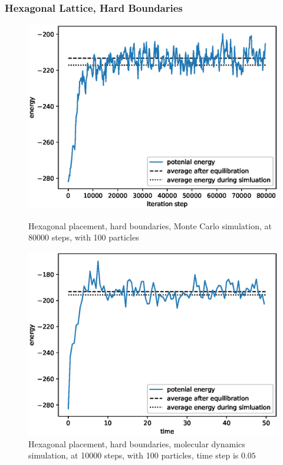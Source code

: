 \documentclass[UTF8,a4paper]{article}
\begin{document}
\subsubsection{Hexagonal Lattice, Hard Boundaries}
\begin{figure}[H]
	\centering
	\begin{minipage}[t]{0.45\textwidth}
		\centering
		\includegraphics[height=0.2\textheight]{fig/plot_hb_norand_80000_steps_100_particles_0.8442_rho_0.728_tempure_1.eps}
		\caption{Hexagonal placement, hard boundaries, Monte Carlo simulation, at 80000 steps, with 100 particles}
	\end{minipage}\hspace{0.5cm}
	\begin{minipage}[t]{0.45\textwidth}
		\centering
		\includegraphics[height=0.2\textheight]{fig/md_plot_norand_hard_10000_steps_100_particles_0.8442_rho_0.728_tempure_.eps}
		\caption{Hexagonal placement, hard boundaries, molecular dynamics simulation, at 10000 steps, with 100 particles, time step is $0.05$}
	\end{minipage}
\end{figure}
\end{document}
